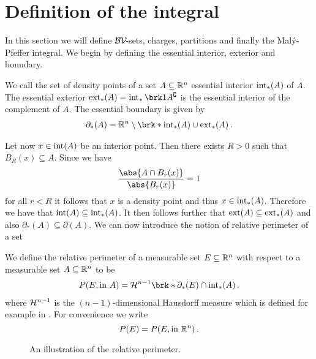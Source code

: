 \section{Definition of the integral}

In this section we will define $\mathcal{BV\!}$-sets, charges, partitions and finally the Malý-Pfeffer integral.
We begin by defining the essential interior, exterior and boundary.

\begin{definition}
We call the set of density points of a set $A\subseteq\mathbb{R}^n$ essential interior $\operatorname{int}_*(A)$ of $A$.
The essential exterior $\exterior_*(A)=\interior_*\brk1{A^\complement}$ is the essential interior of the complement of $A$. The essential boundary is given by
\begin{align*}
	\partial_*(A)=\R^n\setminus\brk*{\interior_*(A)\cup\exterior_*(A)}\,.
\end{align*}
\end{definition}

\noindent Let now $x\in\operatorname{int}(A)$ be an interior point. Then there exists $R>0$ such that $B_R(x)\subseteq A$. Since we have
\begin{align*}
	\frac{\abs{A\cap B_r(x)}}{\abs{B_r(x)}}=1
\end{align*}
for all $r<R$ it follows that $x$ is a density point and thus $x\in\operatorname{int}_*(A)$. Therefore we have that $\operatorname{int}(A)\subseteq \operatorname{int}_*(A)$. It then follows further that $\operatorname{ext}(A)\subseteq\operatorname{ext}_*(A)$ and also $\partial_*(A)\subseteq\partial (A)$. We can now introduce the notion of relative perimeter of a set 

\begin{definition}
We define the relative perimeter of a measurable set $E\subseteq\mathbb{R}^n$ with respect to a measurable set $A\subseteq\mathbb{R}^n$ to be
\begin{align*}
	P(E,\text{in }A)=\cH^{n-1}\brk*{\partial_*(E)\cap \interior_*(A)}\,.
\end{align*}
where $\mathcal{H}^{n-1}$ is the $(n-1)$-dimensional Hausdorff measure which is defined for example in \cite[Chapter 2.10]{Fed1969}. For convenience we write $$P(E)=P(E,\text{in }\mathbb{R}^n)\,.$$
\end{definition}

\begin{wrapfigure}{r}{0.3\textwidth}
\centering
\vspace{-0.0cm}

\caption{An illustration of the relative perimeter.}
\label{fi:relativePerimeter}
\end{wrapfigure}

